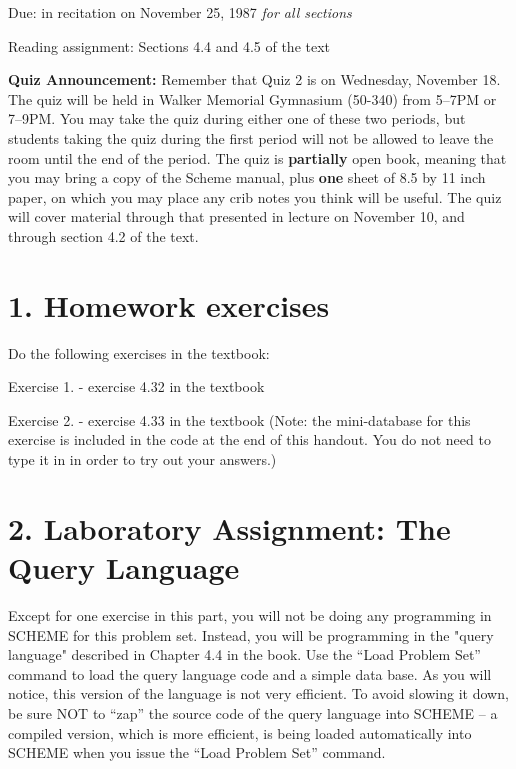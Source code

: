 \vpar
Due: in recitation on November 25, 1987 {\it for all sections}


\vpar
Reading assignment: Sections 4.4 and 4.5 of the text

\vskip 20pt

{\bf Quiz Announcement:}
Remember that Quiz 2 is on Wednesday, November 18.  The quiz 
will be held in Walker Memorial Gymnasium (50-340) from 5--7PM or
7--9PM.  You may take the quiz during either one of these two periods,
but students taking the quiz during the first period will not be allowed
to leave the room until the end of the period.  The quiz is {\bf
partially} open book, meaning that you may bring a copy of the Scheme
manual, plus {\bf one} sheet of 8.5 by 11 inch paper, on which you may
place any crib notes you think will be useful.  The quiz will cover
material through that presented in lecture on November 10, and through
section 4.2 of the text.

\chapter{1. Homework exercises}

Do the following exercises in the textbook:

\beginbullets

\bpar Exercise 1. - exercise 4.32 in the textbook

\bpar Exercise 2. - exercise 4.33 in the textbook (Note: the mini-database
      for this exercise is included in the code at the end of this handout.
      You do not need to type it in in order to try out your answers.)

\chapter{2. Laboratory Assignment: The Query Language}

Except for one exercise in this part, you will not be doing any programming
in SCHEME for this problem set.  Instead, you will be programming in the
"query language" described in Chapter 4.4 in the book.  Use the
``Load Problem Set'' command to load the query language code and a
simple data base.  As you will notice, this version of the language
is not very efficient.  To avoid slowing it down, be sure NOT to ``zap''
the source code of the query language into SCHEME -- a compiled
version, which is more efficient, is being loaded automatically into SCHEME
when you issue the ``Load Problem Set'' command.

